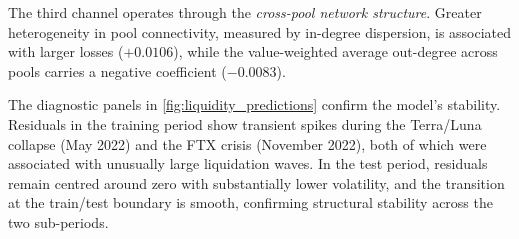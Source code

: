 \documentclass[a4paper,UKenglish,cleveref, autoref, thm-restate]{informs3}
\begin{document}
The third channel operates through the \emph{cross-pool network
structure}. Greater heterogeneity in pool connectivity, measured
by in-degree dispersion, is associated with larger losses
($+0.0106$), while the value-weighted average out-degree across
pools carries a negative coefficient ($-0.0083$).

The diagnostic panels in \autoref{fig:liquidity_predictions}
confirm the model's stability. Residuals in the training period
show transient spikes during the Terra/Luna collapse (May 2022)
and the FTX crisis (November 2022), both of which were associated
with unusually large liquidation waves. In the test period,
residuals remain centred around zero with substantially lower
volatility, and the transition at the train/test boundary is
smooth, confirming structural stability across the two sub-periods.

\medskip
\end{document}
